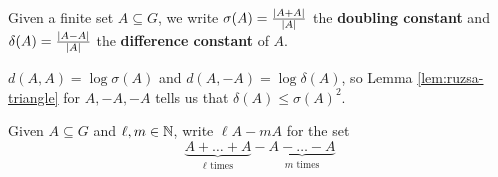 \documentclass{article}
\begin{document}
\begin{dfn}
  Given a finite set $A \subseteq G$, we write $\sigma(A) = \frac{\left\lvert A + A\right\rvert}{\left\lvert A\right\rvert}$ the {\bf doubling constant} and $\delta(A) = \frac{\left\lvert A - A\right\rvert}{\left\lvert A\right\rvert}$ the {\bf difference constant} of $A$.
\end{dfn}

$d(A, A) = \log \sigma(A)$ and $d(A, -A) = \log \delta(A)$, so Lemma \ref{lem:ruzsa-triangle} for $A, -A, -A$ tells us that $\delta(A) \le \sigma(A)^2$.

\newlec

\begin{notation}
  Given $A \subseteq G$ and $\ell, m \in \mathbb N$, write $\ell A - m A$ for the set
  $$\underbrace{A + \dots + A}_{\ell \text{ times}} - \underbrace{A - \dots - A}_{m \text{ times}}$$
\end{notation}
\end{document}
